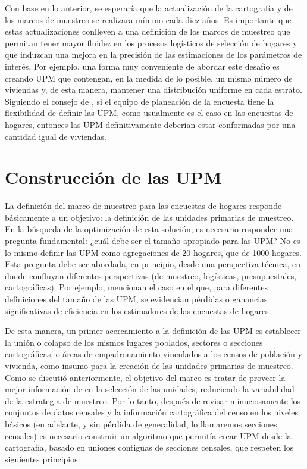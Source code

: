 \documentclass[
  12pt,
  spanish,
]{book}
\begin{document}
Con base en lo anterior, se esperaría que la actualización de la cartografía y de los marcos de muestreo se realizara mínimo cada diez años. Es importante que estas actualizaciones conlleven a una definición de los marcos de muestreo que permitan tener mayor fluidez en los procesos logísticos de selección de hogares y que induzcan una mejora en la precisión de las estimaciones de los parámetros de interés. Por ejemplo, una forma muy conveniente de abordar este desafío es creando UPM que contengan, en la medida de lo posible, un mismo número de viviendas y, de esta manera, mantener una distribución uniforme en cada estrato. Siguiendo el consejo de \citet[pág. 212]{Valliant_Dever_Kreuter_2013}, si el equipo de planeación de la encuesta tiene la flexibilidad de definir las UPM, como usualmente es el caso en las encuestas de hogares, entonces las UPM definitivamente deberían estar conformadas por una cantidad igual de viviendas.

\hypertarget{construcciuxf3n-de-las-upm}{%
\section{Construcción de las UPM}\label{construcciuxf3n-de-las-upm}}

La definición del marco de muestreo para las encuestas de hogares responde básicamente a un objetivo: la definición de las unidades primarias de muestreo. En la búsqueda de la optimización de esta solución, es necesario responder una pregunta fundamental: ¿cuál debe ser el tamaño apropiado para las UPM? No es lo mismo definir las UPM como agregaciones de 20 hogares, que de 1000 hogares. Esta pregunta debe ser abordada, en principio, desde una perspectiva técnica, en donde confluyan diferentes perspectivas (de muestreo, logísticas, presupuestales, cartográficas). Por ejemplo, \citet[Tabla 9.1]{Valliant_Dever_Kreuter_2013} mencionan el caso en el que, para diferentes definiciones del tamaño de las UPM, se evidencian pérdidas o ganancias significativas de eficiencia en los estimadores de las encuestas de hogares.

De esta manera, un primer acercamiento a la definición de las UPM es establecer la unión o colapso de los mismos lugares poblados, sectores o secciones cartográficas, o áreas de empadronamiento vinculados a los censos de población y vivienda, como insumo para la creación de las unidades primarias de muestreo. Como se discutió anteriormente, el objetivo del marco es tratar de proveer la mejor información de en la selección de las unidades, reduciendo la variabilidad de la estrategia de muestreo. Por lo tanto, después de revisar minuciosamente los conjuntos de datos censales y la información cartográfica del censo en los niveles básicos (en adelante, y sin pérdida de generalidad, lo llamaremos secciones censales) es necesario construir un algoritmo que permitía crear UPM desde la cartografía, basado en uniones contiguas de secciones censales, que respeten los siguientes principios:
\end{document}

